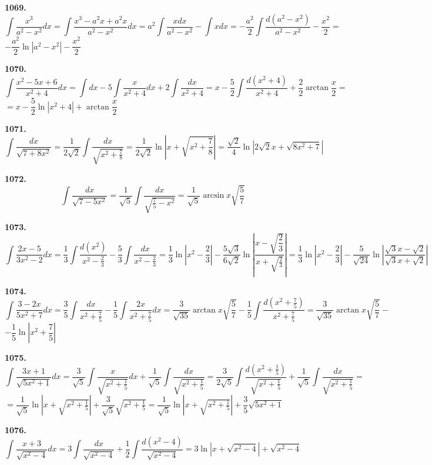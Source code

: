 \documentclass[12pt]{article}
\begin{document}
	{\bf 1069.} \[
		\int \dfrac{x^3}{a^2-x^2}dx = \int \dfrac{x^3-a^2x+a^2x}{a^2-x^2}dx = a^2 \int \dfrac{xdx}{a^2-x^2} -\int xdx = -\dfrac{a^2}{2}\int \dfrac{d(a^2-x^2)}{a^2-x^2} - \dfrac{x^2}{2} = 
	\]
	$
	-\dfrac{a^2}{2}\ln|a^2-x^2|-\dfrac{x^2}{2}
	$\newpage
	
{\bf 1070.} \[
	\int \dfrac{x^2-5x+6}{x^2+4}dx = \int dx -5\int\dfrac{x}{x^2+4}dx + 2\int\dfrac{dx}{x^2+4} = x - \dfrac{5}{2} \int \dfrac{d(x^2+4)}{x^2+4} +\dfrac{2}{2}\arctan\dfrac{x}{2} = 
	\]
	$
	= x - \dfrac{5}{2}\ln|x^2+4| + \arctan\dfrac{x}{2}
	$
	
	\bigskip
	{\bf 1071.} \[
		\int \dfrac{dx}{\sqrt{7+8x^2}} = \dfrac{1}{2\sqrt{2}}\int \dfrac{dx}{\sqrt{x^2 + \frac{7}{8}}} = \dfrac{1}{2\sqrt{2}}\ln\left|x+\sqrt{x^2+\frac{7}{8}}\right| = \dfrac{\sqrt{2}}{4}\ln|2\sqrt{2}x+\sqrt{8x^2+7}|
	\]
	
	{\bf 1072.} \[
		\int \dfrac{dx}{\sqrt{7-5x^2}} = \dfrac{1}{\sqrt{5}}\int \dfrac{dx}{\sqrt{\frac{7}{5}-x^2}} = \dfrac{1}{\sqrt{5}}\arcsin x\sqrt{\dfrac{5}{7}}
	\]
	
	{\bf 1073.} \[
		\int\dfrac{2x-5}{3x^2-2}dx = \dfrac{1}{3}\int \dfrac{d(x^2)}{x^2-\frac{2}{3}}-\dfrac{5}{3}\int \dfrac{dx}{x^2 - \frac{2}{3}} = \dfrac{1}{3} \ln\left|x^2-\dfrac{2}{3}\right| - \dfrac{5\sqrt{3}}{6\sqrt{2}}\ln\left|\dfrac{x-\sqrt{\dfrac{2}{3}}}{x+\sqrt{\frac{2}{3}}}\right| = \dfrac{1}{3}\ln\left|x^2-\dfrac{2}{3}\right| -\dfrac{5}{\sqrt{24}}\ln\left|\dfrac{\sqrt{3}x-\sqrt{2}}{\sqrt{3}x+\sqrt{2}}\right|
	\]
	
	{\bf 1074.} \[
		\int \dfrac{3-2x}{5x^2+7}dx = \dfrac{3}{5} \int \dfrac{dx}{x^2+\frac{7}{5}} - \dfrac{1}{5}\int \dfrac{2x}{x^2+\frac{7}{5}}dx = \dfrac{3}{\sqrt{35}} \arctan x\sqrt{\frac{5}{7}} - \dfrac{1}{5}\int \dfrac{d(x^2+\frac{7}{5})}{x^2+\frac{7}{5}} = \dfrac{3}{\sqrt{35}}\arctan x\sqrt{\dfrac{5}{7}} -
	\]
	$
	 - \dfrac{1}{5} \ln\left|x^2+\dfrac{7}{5}\right|
	$
	\bigskip
	
{\bf 1075.} \[
	\int\dfrac{3x+1}{\sqrt{5x^2+1}}dx = \dfrac{3}{\sqrt{5}} \int \dfrac{x}{\sqrt{x^2+\frac{1}{5}}}dx +\dfrac{1}{\sqrt{5}}\int\dfrac{dx}{\sqrt{x^2+\frac{1}{5}}} = \dfrac{3}{2\sqrt{5}}\int\dfrac{d(x^2+\frac{1}{5})}{\sqrt{x^2+\frac{1}{5}}} + \dfrac{1}{\sqrt{5}}\int \dfrac{dx}{\sqrt{x^2+\frac{1}{5}}} =
	\]
	$ = \dfrac{1}{\sqrt{5}}\ln|x+\sqrt{x^2+\frac{1}{5}}| + \dfrac{3}{\sqrt{5}} \sqrt{x^2+\frac{1}{5}} = \dfrac{1}{\sqrt{5}}\ln|x+\sqrt{x^2+\frac{1}{5}}|+\dfrac{3}{5}\sqrt{5x^2+1}$
	
	\bigskip
	{\bf 1076.} \[
		\int \dfrac{x+3}{\sqrt{x^2-4}}dx = 3\int \dfrac{dx}{\sqrt{x^2-4}} + \dfrac{1}{2} \int \dfrac{d(x^2-4)}{\sqrt{x^2-4}} = 3\ln|x+\sqrt{x^2-4}| + \sqrt{x^2-4}
	\]
	
\end{document}
